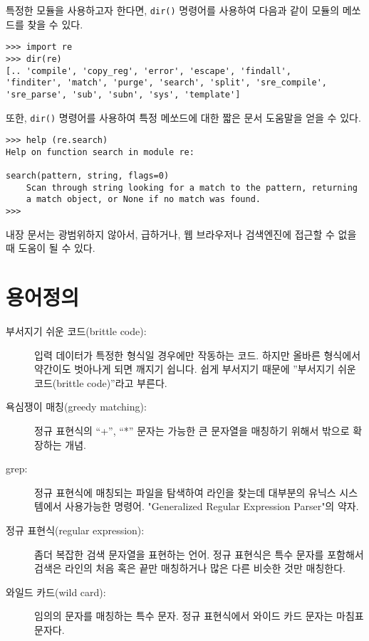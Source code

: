 특정한 모듈을 사용하고자 한다면, {\tt dir()} 명령어를 사용하여 다음과 같이 모듈의 메쏘드를 찾을 수 있다.

\beforeverb
\begin{verbatim}
>>> import re
>>> dir(re)
[.. 'compile', 'copy_reg', 'error', 'escape', 'findall', 
'finditer', 'match', 'purge', 'search', 'split', 'sre_compile', 
'sre_parse', 'sub', 'subn', 'sys', 'template']
\end{verbatim}
\afterverb
%

또한, {\tt dir()} 명령어를 사용하여 특정 메쏘드에 대한 짧은 문서 도움말을 얻을 수 있다.

\beforeverb
\begin{verbatim}
>>> help (re.search)
Help on function search in module re:

search(pattern, string, flags=0)
    Scan through string looking for a match to the pattern, returning
    a match object, or None if no match was found.
>>> 
\end{verbatim}
\afterverb
%

내장 문서는 광범위하지 않아서, 급하거나, 웹 브라우저나 검색엔진에 접근할 수 없을 때 도움이 될 수 있다.

\section{용어정의}

\begin{description}

\item[부서지기 쉬운 코드(brittle code):]
입력 데이터가 특정한 형식일 경우에만 작동하는 코드.
하지만 올바른 형식에서 약간이도 벗아나게 되면 깨지기 쉽니다.
쉽게 부서지기 때문에 ''부서지기 쉬운 코드(brittle code)''라고 부른다.

\item[욕심쟁이 매칭(greedy matching):]
정규 표현식의 ``+'', ``*'' 문자는 가능한 큰 문자열을 매칭하기 위해서 밖으로 확장하는 개념.

\item[grep:]
정규 표현식에 매칭되는 파일을 탐색하여 라인을 찾는데 대부분의 유닉스 시스템에서 사용가능한 명령어.
"Generalized Regular Expression Parser"의 약자.

\item[정규 표현식(regular expression):]
좀더 복잡한 검색 문자열을 표현하는 언어. 정규 표현식은 특수 문자를 포함해서 검색은 라인의 처음 혹은 끝만 매칭하거나 많은 다른 비슷한 것만 매칭한다.

\item[와일드 카드(wild card):]
임의의 문자를 매칭하는 특수 문자. 정규 표현식에서 와이드 카드 문자는 마침표 문자다.

\end{description}

